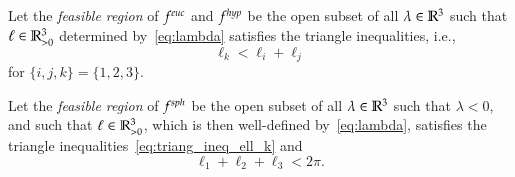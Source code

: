 \documentclass[Thesis]{subfiles}
\begin{document}
\begin{definition}
  Let the \emph{feasible region} of $f^{\euc}$ and $f^{\mathit{hyp}}$ be the
  open subset of all $\lambda\in\mathbb R^{3}$ such that $\ell\in\mathbb R_{>0}^{3}$
  determined by~\eqref{eq:lambda} satisfies the triangle inequalities,
  i.e., 
  \begin{equation}
    \ell_{k}<\ell_{i}+\ell_{j} \label{eq:triang_ineq_ell_k}
  \end{equation}
  for $\{i,j,k\}=\{1,2,3\}$.

  Let the \emph{feasible region} of $f^{\mathit{sph}}$ be the open subset of all
  $\lambda\in\mathbb R^{3}$ such that $\lambda<0$, and such that
  $\ell\in\mathbb R_{>0}^{3}$, which is then well-defined
  by~\eqref{eq:lambda}, satisfies the triangle inequalities~\eqref{eq:triang_ineq_ell_k} and
  \begin{equation}
    \label{eq:triang_ineq_ell_sph}
    \ell_{1}+\ell_{2}+\ell_{3}<2\pi.
  \end{equation}
\end{definition}
\end{document}
